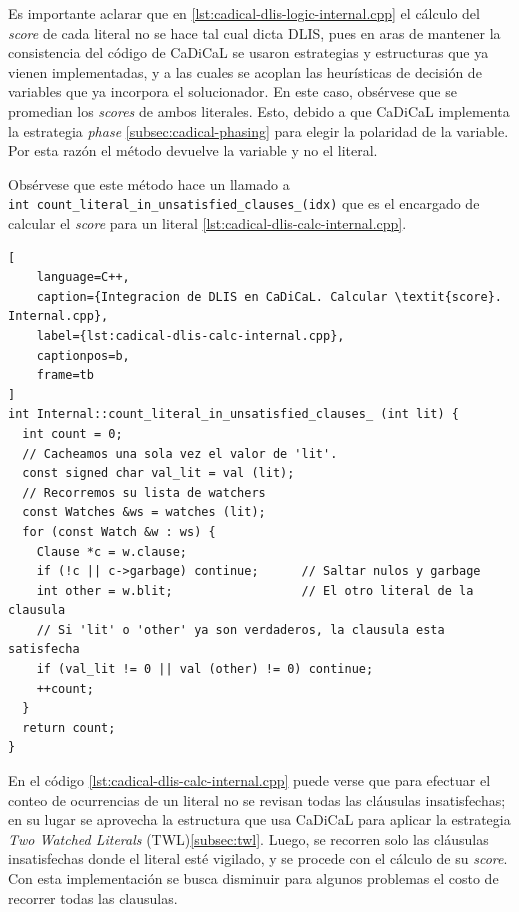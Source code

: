 Es importante aclarar que en \ref{lst:cadical-dlis-logic-internal.cpp} el c\'alculo del \textit{score} de cada literal no se hace tal cual dicta DLIS, pues en aras de mantener la consistencia del c\'odigo de CaDiCaL se usaron estrategias y estructuras que ya vienen implementadas, y a las cuales se acoplan las heur\'isticas de decisi\'on de variables que ya incorpora el solucionador. En este caso, obs\'ervese que se promedian los \textit{scores} de ambos literales. Esto, debido a que CaDiCaL implementa la estrategia \textit{phase} \ref{subsec:cadical-phasing} para elegir la polaridad de la variable. Por esta raz\'on el m\'etodo devuelve la variable y no el literal.

Obs\'ervese que este m\'etodo hace un llamado a\\ \texttt{int count\_literal\_in\_unsatisfied\_clauses\_(idx)} que es el encargado de calcular el \textit{score} para un literal \ref{lst:cadical-dlis-calc-internal.cpp}.

\begin{lstlisting}[
    language=C++,
    caption={Integracion de DLIS en CaDiCaL. Calcular \textit{score}. Internal.cpp},
    label={lst:cadical-dlis-calc-internal.cpp},
    captionpos=b,
    frame=tb
]
int Internal::count_literal_in_unsatisfied_clauses_ (int lit) {
  int count = 0;
  // Cacheamos una sola vez el valor de 'lit'.
  const signed char val_lit = val (lit);
  // Recorremos su lista de watchers
  const Watches &ws = watches (lit);
  for (const Watch &w : ws) {
    Clause *c = w.clause;                
    if (!c || c->garbage) continue;      // Saltar nulos y garbage
    int other = w.blit;                  // El otro literal de la clausula
    // Si 'lit' o 'other' ya son verdaderos, la clausula esta satisfecha
    if (val_lit != 0 || val (other) != 0) continue;
    ++count;
  }
  return count;
}

\end{lstlisting}

En el c\'odigo \ref{lst:cadical-dlis-calc-internal.cpp} puede verse que para efectuar el conteo de ocurrencias de un literal no se revisan todas las cl\'ausulas insatisfechas; en su lugar se aprovecha la estructura que usa CaDiCaL para aplicar la estrategia \textit{Two Watched Literals} (TWL)\ref{subsec:twl}. Luego, se recorren solo las cl\'ausulas insatisfechas donde el literal est\'e vigilado, y se procede con el c\'alculo de su \textit{score}. Con esta implementaci\'on se busca disminuir para algunos problemas el costo de recorrer todas las clausulas.

